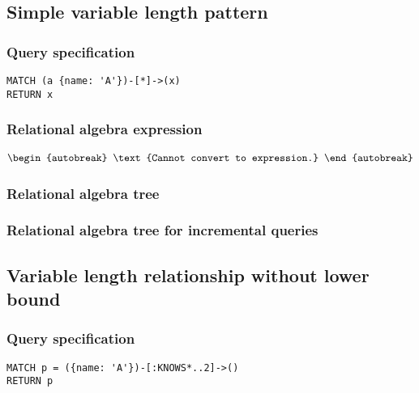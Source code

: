 \subsection{Simple variable length pattern}

\subsubsection*{Query specification}

\begin{lstlisting}
MATCH (a {name: 'A'})-[*]->(x)
RETURN x
\end{lstlisting}

\subsubsection*{Relational algebra expression}

\begin{align*}
\begin{autobreak}
\text{Cannot convert to expression.}
\end{autobreak}
\end{align*}

\subsubsection*{Relational algebra tree}


\subsubsection*{Relational algebra tree for incremental queries}


\subsection{Variable length relationship without lower bound}

\subsubsection*{Query specification}

\begin{lstlisting}
MATCH p = ({name: 'A'})-[:KNOWS*..2]->()
RETURN p
\end{lstlisting}

